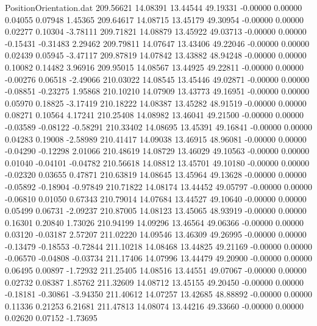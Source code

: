 \begin{filecontents}{PositionOrientation.dat}
 209.56621   14.08391   13.44544    49.19331   -0.00000    0.00000    0.04055    0.07948    1.45365
 209.64617   14.08715   13.45179    49.30954   -0.00000    0.00000    0.02277    0.10304   -3.78111
 209.71821   14.08879   13.45922    49.03713   -0.00000    0.00000   -0.15431   -0.31483    2.29462
 209.79811   14.07647   13.43406    49.22046   -0.00000    0.00000    0.02439    0.05945   -3.47117
 209.87819   14.07842   13.43882    48.94248   -0.00000    0.00000    0.10082    0.14482    3.96916
 209.95015   14.08567   13.44925    49.22811   -0.00000    0.00000   -0.00276    0.06518   -2.49066
 210.03022   14.08545   13.45446    49.02871   -0.00000    0.00000   -0.08851   -0.23275    1.95868
 210.10210   14.07909   13.43773    49.16951   -0.00000    0.00000    0.05970    0.18825   -3.17419
 210.18222   14.08387   13.45282    48.91519   -0.00000    0.00000    0.08271    0.10564    4.17241
 210.25408   14.08982   13.46041    49.21500   -0.00000    0.00000   -0.03589   -0.08122   -0.58291
 210.33402   14.08695   13.45391    49.16841   -0.00000    0.00000    0.04283    0.19008   -2.58989
 210.41417   14.09038   13.46915    48.96081   -0.00000    0.00000   -0.04290   -0.12298    2.01066
 210.48619   14.08729   13.46029    49.10563   -0.00000    0.00000    0.01040   -0.04101   -0.04782
 210.56618   14.08812   13.45701    49.10180   -0.00000    0.00000   -0.02320    0.03655    0.47871
 210.63819   14.08645   13.45964    49.13628   -0.00000    0.00000   -0.05892   -0.18904   -0.97849
 210.71822   14.08174   13.44452    49.05797   -0.00000    0.00000   -0.06810    0.01050    0.67343
 210.79014   14.07684   13.44527    49.10640   -0.00000    0.00000    0.05499    0.06731   -2.09237
 210.87005   14.08123   13.45065    48.93919   -0.00000    0.00000    0.16301    0.20840    1.73026
 210.94199   14.09296   13.46564    49.06366   -0.00000    0.00000    0.03120   -0.03187    2.57207
 211.02220   14.09546   13.46309    49.26995   -0.00000    0.00000   -0.13479   -0.18553   -0.72844
 211.10218   14.08468   13.44825    49.21169   -0.00000    0.00000   -0.06570   -0.04808   -0.03734
 211.17406   14.07996   13.44479    49.20900   -0.00000    0.00000    0.06495    0.00897   -1.72932
 211.25405   14.08516   13.44551    49.07067   -0.00000    0.00000    0.02732    0.08387    1.85762
 211.32609   14.08712   13.45155    49.20450   -0.00000    0.00000   -0.18181   -0.30861   -3.94350
 211.40612   14.07257   13.42685    48.88892   -0.00000    0.00000    0.11336    0.21253    6.21681
 211.47813   14.08074   13.44216    49.33660   -0.00000    0.00000    0.02620    0.07152   -1.73695

\end{filecontents}
